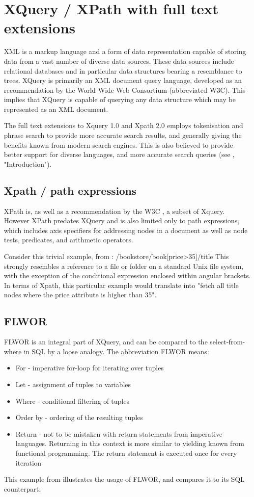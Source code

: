\section{XQuery / XPath with full text extensions}

XML is a markup language and a form of data representation capable of storing data from a vast number of diverse data sources. These data sources include relational databases and in particular data structures bearing a resemblance to trees. XQuery is primarily an XML document query language, developed as an recommendation by the World Wide Web Consortium\cite{w3c00} (abbreviated W3C). This implies that XQuery is capable of querying any data structure which may be represented as an XML document.

The full text extensions to Xquery 1.0 and Xpath 2.0 employs tokenisation and phrase search to provide more accurate search results, and generally giving the benefits known from modern search engines. This is also believed to provide better support for diverse languages, and more accurate search queries (see \cite{w3c02}, "Introduction").

\subsection{Xpath / path expressions}
XPath is, as well as a recommendation by the W3C \cite{w3c01}, a subset of Xquery. However XPath predates XQuery and is also limited only to path expressions, which includes axis specifiers for addressing nodes in a document as well as node tests, predicates, and arithmetic operators.

Consider this trivial example, from \cite{w3s00}:
/bookstore/book[price>35]/title
This strongly resembles a reference to a file or folder on a standard Unix file system, with the exception of the conditional expression enclosed within angular brackets. In terms of Xpath, this particular example would translate into "fetch all title nodes where the price attribute is higher than 35".

\subsection{FLWOR}
FLWOR is an integral part of XQuery, and can be compared to the select-from-where in SQL by a loose analogy. The abbreviation FLWOR means:
\begin{itemize}
\item For - imperative for-loop for iterating over tuples
\item Let - assignment of tuples to variables
\item Where - conditional filtering of tuples
\item Order by - ordering of the resulting tuples
\item Return - not to be mistaken with return statements from imperative languages. Returning in this context is more similar to yielding known from functional programming. The return statement is executed once for every iteration
\end{itemize}
This example from \cite{styl00} illustrates the usage of FLWOR, and compares it to its SQL counterpart:

